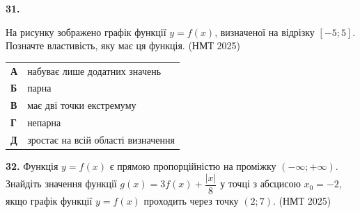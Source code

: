 \documentclass[14pt]{extarticle}
\newcommand{\nmtyear}[1]{\hfill{\small\color{yearcolor}(НМТ #1)}}
\begin{document}
\noindent\textbf{31.} \begin{minipage}[t]{0.55\textwidth}
На рисунку зображено графік функції $y=f(x)$, визначеної на відрізку $[-5; 5]$. Позначте властивість, яку має ця функція. \nmtyear{2025}
\end{minipage}
\hfill
\begin{minipage}[t]{0.4\textwidth}
    \vspace{-0.5cm}
    \begin{flushright}
    \end{flushright}
\end{minipage}

\vspace{0.2cm}
\begin{tabular}{ll}
    \textbf{А} & набуває лише додатних значень \\[0.3cm]
    \textbf{Б} & парна \\[0.3cm]
    \textbf{В} & має дві точки екстремуму \\[0.3cm]
    \textbf{Г} & непарна \\[0.3cm]
    \textbf{Д} & зростає на всій області визначення \\
\end{tabular}

\vspace{0.7cm}

\vspace{0.7cm}

\noindent\textbf{32.} Функція $y=f(x)$ є прямою пропорційністю на проміжку $(-\infty; +\infty)$. Знайдіть значення функції $g(x) = 3f(x) + \dfrac{|x|}{8}$ у точці з абсцисою $x_0 = -2$, якщо графік функції $y=f(x)$ проходить через точку $(2; 7)$. \nmtyear{2025}
\end{document}

